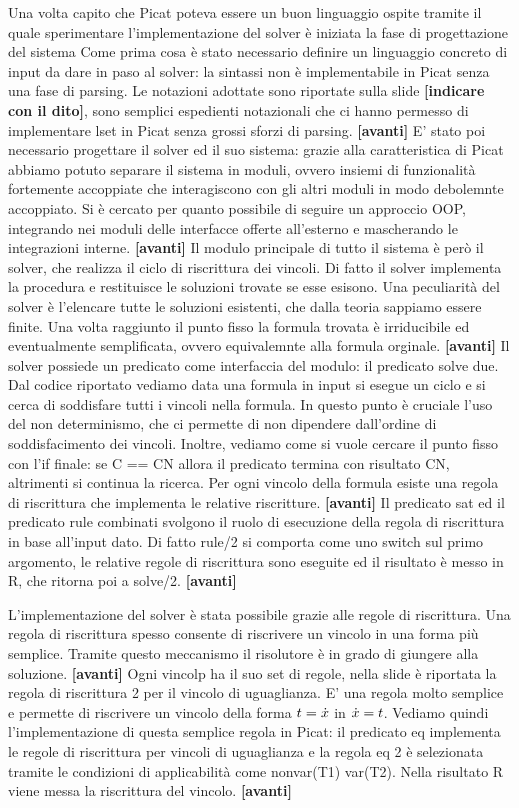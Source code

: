 \documentclass[11pt]{article}
\newcommand*{\nextslide}{\textbf{[avanti]}}
\newcommand*{\fingerpointer}{\textbf{[indicare con il dito]}}
\begin{document}
Una volta capito che Picat poteva essere un buon linguaggio ospite
tramite il quale sperimentare l'implementazione del solver è iniziata
la fase di progettazione del sistema  Come prima cosa è stato necessario definire un linguaggio
concreto di input da dare in paso al solver: la sintassi \lset{} non è
implementabile in Picat senza una fase di parsing. Le notazioni
adottate sono riportate sulla slide \fingerpointer{}, sono semplici
espedienti notazionali che ci hanno permesso di implementare lset in
Picat senza grossi sforzi di parsing. \nextslide{} E' stato poi
necessario progettare il solver ed il suo sistema: grazie alla
caratteristica di Picat abbiamo potuto separare il sistema in moduli,
ovvero insiemi di funzionalità fortemente accoppiate che interagiscono
con gli altri moduli in modo debolemnte accoppiato. Si è cercato per
quanto possibile di seguire un approccio OOP, integrando nei moduli
delle interfacce offerte all'esterno e mascherando le integrazioni
interne. \nextslide{} Il modulo principale di tutto il sistema è però
il solver, che realizza il ciclo di riscrittura dei vincoli. Di fatto
il solver implementa la procedura \satset{} e restituisce le soluzioni
trovate se esse esisono. Una peculiarità del solver è l'elencare tutte
le soluzioni esistenti, che dalla teoria sappiamo essere finite. Una
volta raggiunto il punto fisso la formula trovata è irriducibile ed
eventualmente semplificata, ovvero equivalemnte alla formula
orginale. \nextslide{} Il solver possiede un predicato come
interfaccia del modulo: il predicato solve due. Dal codice riportato
vediamo data una formula in input si esegue un ciclo e si cerca di
soddisfare tutti i vincoli nella formula. In questo punto è cruciale
l'uso del non determinismo, che ci permette di non dipendere
dall'ordine di soddisfacimento dei vincoli. Inoltre, vediamo come si
vuole cercare il punto fisso con l'if finale: se C == CN allora il
predicato termina con risultato CN, altrimenti si continua la
ricerca. Per ogni vincolo della formula esiste una regola di
riscrittura che implementa le relative riscritture. \nextslide{} Il
predicato sat ed il predicato rule combinati svolgono il ruolo di
esecuzione della regola di riscrittura in base all'input dato. Di
fatto rule/2 si comporta come uno switch sul primo argomento, le
relative regole di riscrittura sono eseguite ed il risultato è messo
in R, che ritorna poi a solve/2. \nextslide{}

L'implementazione del solver è stata possibile grazie alle regole di
riscrittura. Una regola di riscrittura spesso consente di riscrivere
un vincolo in una forma più semplice. Tramite questo meccanismo il
risolutore è in grado di giungere alla soluzione. \nextslide{} Ogni
vincolp ha il suo set di regole, nella slide è riportata la regola di
riscrittura 2 per il vincolo di uguaglianza. E' una regola molto
semplice e permette di riscrivere un vincolo della forma $t = \dot{x}$
in $\dot{x} = t$. Vediamo quindi l'implementazione di questa semplice
regola in Picat: il predicato eq implementa le regole di riscrittura
per vincoli di uguaglianza e la regola eq 2 è selezionata tramite le
condizioni di applicabilità come nonvar(T1) var(T2). Nella risultato R
viene messa la riscrittura del vincolo. \nextslide{}
\end{document}
